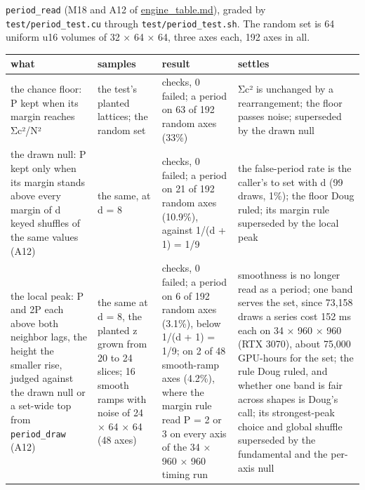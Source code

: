 \texttt{period\_\allowbreak{}read} (M18 and A12 of \hyperref[chap:engine-table]{engine\_\allowbreak{}table.md}), graded by \texttt{test/\allowbreak{}period\_\allowbreak{}test.\allowbreak{}cu} through \texttt{test/\allowbreak{}period\_\allowbreak{}test.\allowbreak{}sh}. The random set is 64 uniform u16 volumes of 32 × 64 × 64, three axes each, 192 axes in all.

{\footnotesize
\setlength{\tabcolsep}{6pt}
\begin{longtable}{>{\RaggedRight\arraybackslash}p{}>{\RaggedRight\arraybackslash}p{}>{\RaggedRight\arraybackslash}p{}>{\RaggedRight\arraybackslash}p{}}
\toprule
what & samples & result & settles \\
\midrule
\endhead
the chance floor: P kept when its margin reaches Σc²/N² & the test's planted lattices; the random set & 431 checks, 0 failed; a period on 63 of 192 random axes (33\%) & Σc² is unchanged by a rearrangement; the floor passes noise; superseded by the drawn null \\
the drawn null: P kept only when its margin stands above every margin of d keyed shuffles of the same values (A12) & the same, at d = 8 & 502 checks, 0 failed; a period on 21 of 192 random axes (10.9\%), against 1/(d + 1) = 1/9 & the false-period rate is the caller's to set with d (99 draws, 1\%); the floor Doug ruled; its margin rule superseded by the local peak \\
the local peak: P and 2P each above both neighbor lags, the height the smaller rise, judged against the drawn null or a set-wide top from \texttt{period\_\allowbreak{}draw} (A12) & the same at d = 8, the planted z grown from 20 to 24 slices; 16 smooth ramps with noise of 24 × 64 × 64 (48 axes) & 700 checks, 0 failed; a period on 6 of 192 random axes (3.1\%), below 1/(d + 1) = 1/9; on 2 of 48 smooth-ramp axes (4.2\%), where the margin rule read P = 2 or 3 on every axis of the 34 × 960 × 960 timing run & smoothness is no longer read as a period; one band serves the set, since 73,158 draws a series cost 152 ms each on 34 × 960 × 960 (RTX 3070), about 75,000 GPU-hours for the set; the rule Doug ruled, and whether one band is fair across shapes is Doug's call; its strongest-peak choice and global shuffle superseded by the fundamental and the per-axis null \\

\end{longtable}}
